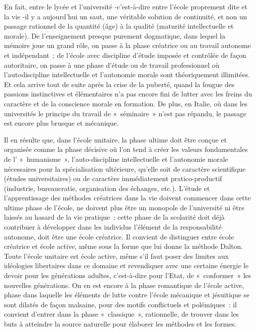 \documentclass[french,twoside]{book} %
\begin{document}
En fait, entre le lycée et l’université -c’est-à-dire entre l’école proprement dite et la vie -il y a aujourd’hui un saut, une véritable solution de continuité, et non un passage rationnel de la quantité (âge) à la qualité (maturité intellectuelle et morale). De l’enseignement presque purement dogmatique, dans lequel la mémoire joue un grand rôle, on passe à la phase créatrice ou au travail autonome et indépendant ; de l’école avec discipline d’étude imposée et contrôlée de façon autoritaire, on passe à une phase d’étude ou de travail professionnel où l’autodiscipline intellectuelle et l’autonomie morale sont théoriquement illimitées. Et cela arrive tout de suite après la crise de la puberté, quand la fougue des passions instinctives et élémentaires n’a pas encore fini de lutter avec les freins du caractère et de la conscience morale en formation. De plus, en Italie, où dans les universités le principe du travail de « séminaire » n’est pas répandu, le passage est encore plus brusque et mécanique.\par
 Il en résulte que, dans l’école unitaire, la phase ultime doit être conçue et organisée comme la phase décisive où l’on tend à créer les valeurs fondamentales de l’ « humanisme », l’auto-discipline intellectuelle et l’autonomie morale nécessaires pour la spécialisation ultérieure, qu’elle soit de caractère scientifique (études universitaires) ou de caractère immédiatement pratico-productif (industrie, bureaucratie, organisation des échanges, etc.). L'étude et l’apprentissage des méthodes créatrices dans la vie doivent commencer dans cette ultime phase de l’école, ne doivent plus être un monopole de l’université ni être laissés au hasard de la vie pratique : cette phase de la scolarité doit déjà contribuer à développer dans les individus l’élément de la responsabilité autonome, doit être une école créatrice. Il convient de distinguer entre école créatrice et école active, même sous la forme que lui donne la méthode Dalton. Toute l’école unitaire est école active, même s’il faut poser des limites aux idéologies libertaires dans ce domaine et revendiquer avec une certaine énergie le devoir pour les générations adultes, c’est-à-dire pour l’Etat, de « conformer » les nouvelles générations. On en est encore à la phase romantique de l’école active, phase dans laquelle les éléments de lutte contre l’école mécanique et jésuitique se sont dilatés de façon malsaine, pour des motifs conflictuels et polémiques : il convient d’entrer dans la phase « classique », rationnelle, de trouver dans les buts à atteindre la source naturelle pour élaborer les méthodes et les formes.\par
\end{document}
